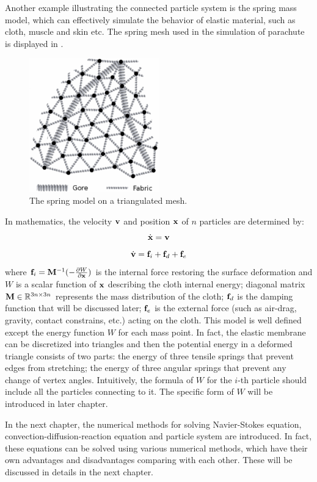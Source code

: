 Another example illustrating the connected particle system is the spring mass model, which can effectively simulate the behavior of elastic material, such as cloth\cite{Baraff1998Large}, muscle \cite{NedelReal1998} and skin\cite{GelderApproximate1998} etc. The spring mesh used in the simulation of parachute is displayed in . 
\begin{figure}
\centering
\includegraphics[width=0.5\textwidth]{Figures/goremesh} 
\caption{The spring model on a triangulated mesh.} 
\label{fig:spring_mesh}
\end{figure}
In mathematics, the velocity $\mathbf{v}$ and position $\mathbf{x}$ of $n$ particles are determined by:
\begin{equation}
\dot{\mathbf{x}} = \mathbf{v}
\label{spring_x_eqn}
\end{equation}
\begin{equation}
\dot{\mathbf{v}} = \mathbf{f}_i
				+ \mathbf{f}_d + \mathbf{f}_e \label{spring_v_eqn}
\end{equation}
where $\mathbf{f}_i = \mathbf{M}^{-1}(-\frac{\partial W}{\partial \mathbf{x}})$ is the internal force restoring the surface deformation and $W$ is a scalar function of $\mathbf{x}$ describing the cloth internal energy; diagonal matrix $\mathbf{M} \in \mathbb{R}^{3n\times 3n}$ represents the mass distribution of the cloth; $\mathbf{f}_d$ is the damping function that will be discussed later; $\mathbf{f}_e$ is the external force (such as air-drag, gravity, contact constrains, etc.) acting on the cloth. This model is well defined except the energy function $W$ for each mass point. In fact, the elastic membrane can be discretized into triangles and then the potential energy in a deformed triangle consists of two parts: the energy of three tensile springs that prevent edges from stretching; the energy of three angular springs that prevent any change of vertex angles. Intuitively, the formula of $W$ for the $i$-th particle should include all the particles connecting to it. The specific form of $W$ will be introduced in later chapter.

In the next chapter, the numerical methods for solving Navier-Stokes equation, convection-diffusion-reaction equation and particle system are introduced. In fact, these equations can be solved using various numerical methods, which have their own advantages and disadvantages comparing with each other. These will be discussed in details in the next chapter.

